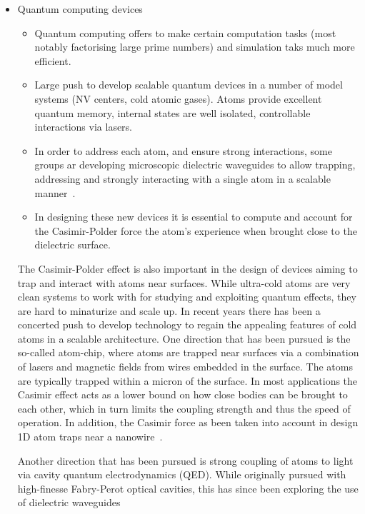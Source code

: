 \begin{itemize}
\item Quantum computing devices
    \begin{itemize}
      \item Quantum computing offers to make certain computation tasks (most notably factorising 
        large prime numbers) and simulation taks much more efficient.  
      \item Large push to develop scalable quantum devices in a number of model systems
        (NV centers, cold atomic gases).  Atoms provide excellent quantum memory, internal
        states are well isolated, controllable interactions via lasers.  
      \item In order to address each atom, and ensure strong interactions, some groups 
        ar developing microscopic dielectric waveguides to allow trapping, addressing and strongly interacting with a 
        single atom in a scalable manner~\cite{Alton2011, Hung2013, Goban2014}.  
      \item In designing these new devices it is essential to compute and account for the Casimir-Polder force
        the atom's experience when brought close to the dielectric surface.  
    \end{itemize}

    The Casimir-Polder effect is also important in the design of devices aiming to trap and interact
    with atoms near surfaces.  While ultra-cold atoms are very clean systems to work with for 
    studying and exploiting quantum effects, they are hard to minaturize and scale up.  In recent
    years there has been a concerted push to develop technology to regain the appealing features 
    of cold atoms in a scalable architecture. 
    One direction that has been pursued is the so-called atom-chip\cite{Folman2000,Schneider2003}, where atoms are 
    trapped near surfaces via a combination of lasers and magnetic fields from wires embedded in
    the surface.  The atoms are typically trapped within a micron of the surface.  
    In most applications the Casimir effect acts as a lower bound on how close bodies can be brought 
    to each other, which in turn limits the coupling strength and thus the speed of operation.  
    In addition, the Casimir force as been taken into account in design 1D atom traps 
    near a nanowire~\cite{Salem2010}.

    Another direction that has been pursued is strong coupling of atoms to light via cavity 
    quantum electrodynamics (QED).  While originally pursued with high-finesse Fabry-Perot optical
    cavities, this has since been exploring the use of dielectric waveguides


\end{itemize}
